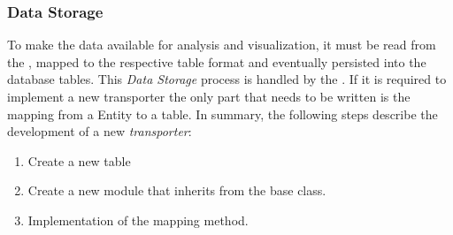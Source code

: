 \subsubsection{Data Storage}
\label{subsubsec:storage}
To make the data available for analysis and visualization, it must be read from the \gds{}, mapped to the respective table format and eventually persisted into the \pg{} database tables.
\newline
This \textit{Data Storage} process is handled by the  . If it is required to implement a new transporter the only part that needs to be written is the mapping from a \gds{} Entity to a \pg{} table.
\newline
In summary, the following steps describe the development of a new \textit{transporter}:
\begin{enumerate}
  \item Create a new \pg{} table
  \item Create a new  module that inherits from the base  class.
  \item Implementation of the mapping method.
\end{enumerate}
